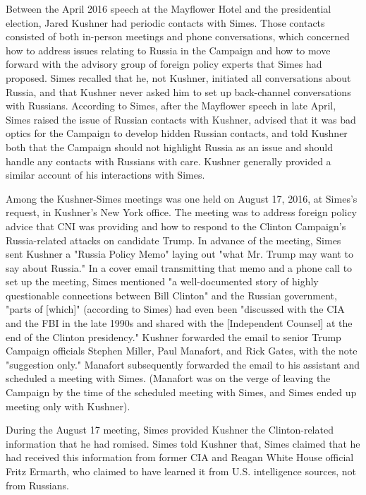 Between the April 2016 speech at the Mayflower Hotel and the presidential election, Jared Kushner had periodic contacts with Simes.%
Those contacts consisted of both in-person meetings and phone conversations, which concerned how to address issues relating to Russia in the Campaign and how to move forward with the advisory group of foreign policy experts that Simes had proposed.%
Simes recalled that he, not Kushner, initiated all conversations about Russia, and that Kushner never asked him to set up back-channel conversations with Russians.%
According to Simes, after the Mayflower speech in late April, Simes raised the issue of Russian contacts with Kushner, advised that it was bad optics for the Campaign to develop hidden Russian contacts, and told Kushner both that the Campaign should not highlight Russia as an issue and should handle any contacts with Russians with care.%
Kushner generally provided a similar account of his interactions with Simes.%

Among the Kushner-Simes meetings was one held on August 17, 2016, at Simes's request, in Kushner's New York office.
The meeting was to address foreign policy advice that CNI was providing and how to respond to the Clinton Campaign's Russia-related attacks on candidate Trump.%
In advance of the meeting, Simes sent Kushner a "Russia Policy Memo" laying out "what Mr. Trump may want to say about Russia."%
In a cover email transmitting that memo and a phone call to set up the meeting, Simes mentioned "a well-documented story of highly questionable connections between Bill Clinton" and the Russian government, "parts of [which]" (according to Simes) had even been "discussed with the CIA and the FBI in the late 1990s and shared with the [Independent Counsel] at the end of the Clinton presidency."%
Kushner forwarded the email to senior Trump Campaign officials Stephen Miller, Paul Manafort, and Rick Gates, with the note "suggestion only."%
Manafort subsequently forwarded the email to his assistant and scheduled a meeting with Simes.%
(Manafort was on the verge of leaving the Campaign by the time of the scheduled meeting with Simes, and Simes ended up meeting only with Kushner).

During the August 17 meeting, Simes provided Kushner the Clinton-related information that he had romised.%
Simes told Kushner that,
Simes claimed that he had received this information from former CIA and Reagan White House official Fritz Ermarth, who claimed to have learned it from U.S. intelligence sources, not from Russians.%

